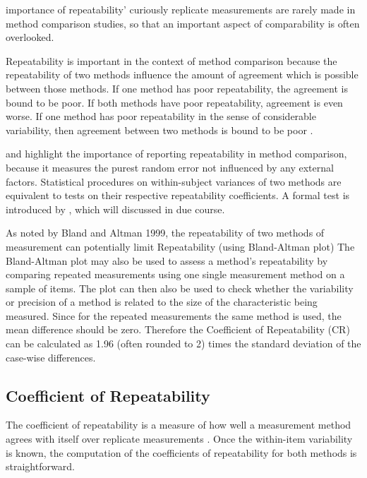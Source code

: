 \documentclass[12pt, a4paper]{article}
\begin{document}
importance of repeatability' curiously replicate measurements are rarely made in method comparison studies, so that an important aspect of comparability is often overlooked.

Repeatability is important in the context of method comparison because the repeatability of two methods influence the amount of agreement which is possible between those methods. If one method has poor repeatability, the agreement is bound to be poor. If both methods have poor repeatability, agreement is even worse. If one method has poor repeatability in the sense of considerable variability, then agreement between two methods is bound to be poor \citep{ARoy2009}.

\citet{barnhart} and \citet{roy} highlight the importance of reporting repeatability in method comparison, because it measures the purest random error not influenced by any external factors. Statistical procedures on within-subject variances of two methods are equivalent to tests on their respective repeatability coefficients. A formal test is introduced by \citet{roy}, which will discussed in due course.

As noted by Bland and Altman 1999, the repeatability of two methods of measurement can  potentially limit
Repeatability (using Bland-Altman plot)
The Bland-Altman plot may also be used to assess a method’s repeatability by comparing repeated measurements using one single measurement method on a sample of items.
The plot can then also be used to check whether the variability or precision of a method is related to the size of the characteristic being measured.
Since for the repeated measurements the same method is used, the mean difference should be zero.
Therefore the Coefficient of Repeatability (CR) can be calculated as 1.96 (often rounded to 2) times the standard deviation of the case-wise differences.

\subsection{Coefficient of Repeatability}
The coefficient of repeatability is a measure of how well a
measurement method agrees with itself over replicate measurements
\citep{BA99}. Once the within-item variability is known, the
computation of the coefficients of repeatability for both methods
is straightforward.
\end{document}
